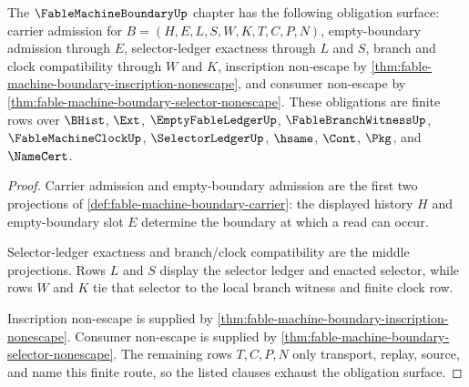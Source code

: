 \begin{theorem}
\label{thm:fable-machine-boundary-obligation-closure}
The $\FableMachineBoundaryUp$ chapter has the following obligation surface: carrier admission for $B=(H,E,L,S,W,K,T,C,P,N)$, empty-boundary admission through $E$, selector-ledger exactness through $L$ and $S$, branch and clock compatibility through $W$ and $K$, inscription non-escape by \autoref{thm:fable-machine-boundary-inscription-nonescape}, and consumer non-escape by \autoref{thm:fable-machine-boundary-selector-nonescape}. These obligations are finite rows over $\BHist$, $\Ext$, $\EmptyFableLedgerUp$, $\FableBranchWitnessUp$, $\FableMachineClockUp$, $\SelectorLedgerUp$, $\hsame$, $\Cont$, $\Pkg$, and $\NameCert$.
\end{theorem}
\begin{proof}
Carrier admission and empty-boundary admission are the first two projections of \autoref{def:fable-machine-boundary-carrier}: the displayed history $H$ and empty-boundary slot $E$ determine the boundary at which a read can occur.

Selector-ledger exactness and branch/clock compatibility are the middle projections. Rows $L$ and $S$ display the selector ledger and enacted selector, while rows $W$ and $K$ tie that selector to the local branch witness and finite clock row.

Inscription non-escape is supplied by \autoref{thm:fable-machine-boundary-inscription-nonescape}. Consumer non-escape is supplied by \autoref{thm:fable-machine-boundary-selector-nonescape}. The remaining rows $T,C,P,N$ only transport, replay, source, and name this finite route, so the listed clauses exhaust the obligation surface.
\end{proof}

